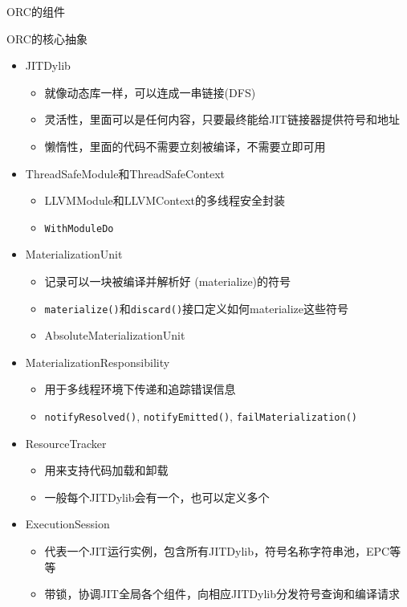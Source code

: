 \documentclass[
  8pt,
  ignorenonframetext,
  aspectratio=169]{beamer}
\providecommand{\tightlist}{%
  \setlength{\itemsep}{0pt}\setlength{\parskip}{0pt}}
\begin{document}
\begin{frame}[fragile]{ORC的组件}
\protect\hypertarget{orcux7684ux7ec4ux4ef6-1}{}
\begin{block}{ORC的核心抽象}
\protect\hypertarget{orcux7684ux6838ux5fc3ux62bdux8c61}{}
\begin{itemize}
\tightlist
\item
  JITDylib

  \begin{itemize}
  \tightlist
  \item
    就像动态库一样，可以连成一串链接(DFS)
  \item
    灵活性，里面可以是任何内容，只要最终能给JIT链接器提供符号和地址
  \item
    懒惰性，里面的代码不需要立刻被编译，不需要立即可用
  \end{itemize}
\item
  ThreadSafeModule和ThreadSafeContext

  \begin{itemize}
  \tightlist
  \item
    LLVMModule和LLVMContext的多线程安全封装
  \item
    \texttt{WithModuleDo}
  \end{itemize}
\item
  MaterializationUnit

  \begin{itemize}
  \tightlist
  \item
    记录可以一块被编译并解析好 (materialize)的符号
  \item
    \texttt{materialize()}和\texttt{discard()}接口定义如何materialize这些符号
  \item
    AbsoluteMaterializationUnit
  \end{itemize}
\item
  MaterializationResponsibility

  \begin{itemize}
  \tightlist
  \item
    用于多线程环境下传递和追踪错误信息
  \item
    \texttt{notifyResolved()}, \texttt{notifyEmitted()},
    \texttt{failMaterialization()}
  \end{itemize}
\item
  ResourceTracker

  \begin{itemize}
  \tightlist
  \item
    用来支持代码加载和卸载
  \item
    一般每个JITDylib会有一个，也可以定义多个
  \end{itemize}
\item
  ExecutionSession

  \begin{itemize}
  \tightlist
  \item
    代表一个JIT运行实例，包含所有JITDylib，符号名称字符串池，EPC等等
  \item
    带锁，协调JIT全局各个组件，向相应JITDylib分发符号查询和编译请求
  \end{itemize}
\end{itemize}
\end{block}
\end{frame}
\end{document}
